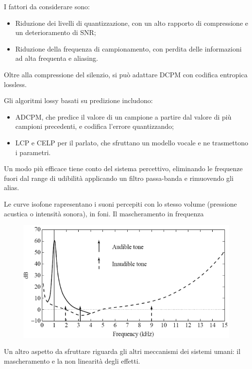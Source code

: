  I fattori da considerare sono:
 \begin{itemize}
 	\item Riduzione dei livelli di quantizzazione, con un alto rapporto di compressione e un deterioramento di SNR;
 	\item Riduzione della frequenza di campionamento, con perdita delle informazioni ad alta frequenta e aliasing.
 \end{itemize}

Oltre alla compressione del silenzio, si può adattare DCPM con codifica entropica lossless.

Gli algoritmi lossy basati su predizione includono:
\begin{itemize}
	\item ADCPM, che predice il valore di un campione a partire dal valore di più campioni precedenti, e codifica l'errore quantizzando;
	\item LCP e CELP per il parlato, che sfruttano un modello vocale e ne trasmettono i parametri.
\end{itemize}
 
Un modo più efficace tiene conto del sistema percettivo, eliminando le frequenze fuori dal range di udibilità applicando un filtro passa-banda e rimuovendo gli alias. 

Le curve isofone rapresentano i suoni percepiti con lo stesso volume (pressione acustica o intensità sonora), in foni. Il mascheramento in frequenza 

\begin{figure}[h]
	\centering
	\includegraphics[scale=0.6]{Lezioni/Immagini/mascheramento}
\end{figure}

Un altro aspetto da sfruttare riguarda gli altri meccanismi dei sistemi umani: il mascheramento e la non linearità degli effetti. 
 
